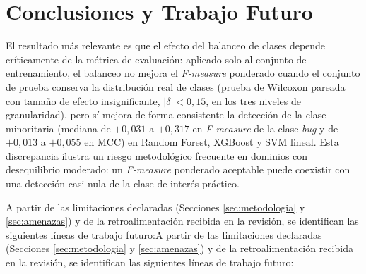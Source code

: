 \documentclass[conference,a4paper]{IEEEtran}
\newif\ifmarcarcambios
\newcommand{\cambio}[1]{\ifmarcarcambios\ifvmode\leavevmode\fi{\color{azulcambio}#1}\else#1\fi}
\begin{document}
\section{Conclusiones y Trabajo Futuro}
\label{sec:conclusiones}

El resultado más relevante es que el efecto del balanceo de clases depende críticamente de la métrica de evaluación: aplicado solo al conjunto de entrenamiento, el balanceo no mejora el \textit{F-measure} ponderado cuando el conjunto de prueba conserva la distribución real de clases (prueba de Wilcoxon pareada con tamaño de efecto insignificante, $|\delta| < 0{,}15$, en los tres niveles de granularidad), pero sí mejora de forma consistente la detección de la clase minoritaria (mediana de $+0{,}031$ a $+0{,}317$ en \textit{F-measure} de la clase \textit{bug} y de $+0{,}013$ a $+0{,}055$ en MCC) en Random Forest, XGBoost y SVM lineal. Esta discrepancia ilustra un riesgo metodológico frecuente en dominios con desequilibrio moderado: un \textit{F-measure} ponderado aceptable puede coexistir con una detección casi nula de la clase de interés práctico.

\cambio{A partir de las limitaciones declaradas (Secciones \ref{sec:metodologia} y \ref{sec:amenazas}) y de la retroalimentación recibida en la revisión, se identifican las siguientes líneas de trabajo futuro:}
\end{document}
